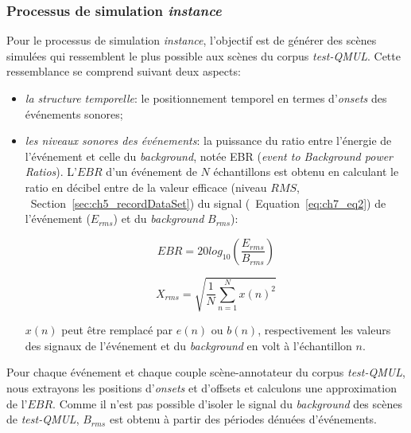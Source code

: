 
\subsubsection{Processus de simulation \emph{instance}}
\label{sec:ch7_simuProcessInstance}

Pour le processus de simulation \emph{instance}, l'objectif est de générer des scènes simulées qui ressemblent le plus possible aux scènes du corpus \emph{test-QMUL}. Cette ressemblance se comprend suivant deux aspects:

\begin{itemize}
\item \emph{la structure temporelle}: le positionnement temporel en termes d'\emph{onsets} des événements sonores;
\item \emph{les niveaux sonores des événements}: la puissance du ratio entre l'énergie de l'événement et celle du \emph{background}, notée EBR (\emph{event to Background power Ratios}). L'$EBR$ d'un événement de $N$ échantillons est obtenu en calculant le ratio en décibel entre de la valeur efficace (niveau $RMS$, \cf~Section~\ref{sec:ch5_recordDataSet}) du signal (\cf~Equation~\ref{eq:ch7_eq2}) de l'événement ($E_{rms}$) et du \emph{background}  $B_{rms}$):

\begin{equation}
\label{eq:ch7_eq1}
EBR=20log_{10} \left(  \dfrac{E_{rms}}{B_{rms}} \right) 
\end{equation}

\begin{equation}
\label{eq:ch7_eq2}
X_{rms}=\sqrt{\dfrac{1}{N} \sum_{n=1}^{N} x(n)^2}
\end{equation}

$x(n)$ peut être remplacé par $e(n)$ ou $b(n)$, respectivement les valeurs des signaux de l'événement et du \emph{background} en volt à l'échantillon $n$. 
\end{itemize}

Pour chaque événement et chaque couple scène-annotateur du corpus \emph{test-QMUL}, nous extrayons les positions d'\emph{onsets} et d'{offsets} et calculons une approximation de l'$EBR$. Comme il n'est pas possible d'isoler le signal du \emph{background} des scènes de \emph{test-QMUL}, $B_{rms}$ est obtenu à partir des périodes dénuées d'événements. \\
 
 \\

